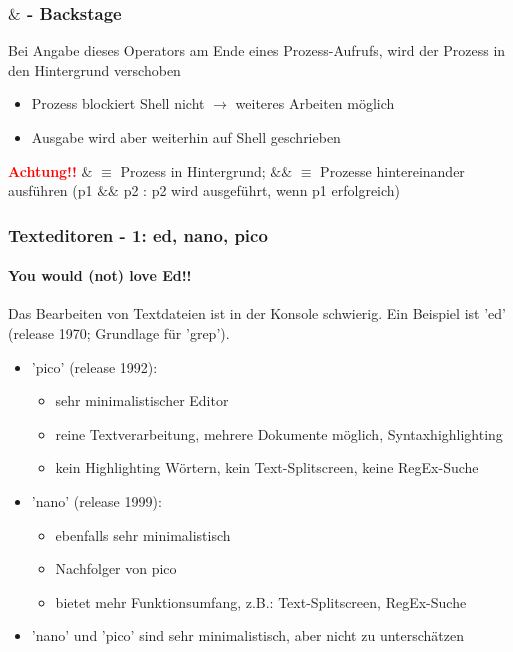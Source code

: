 \documentclass[12pt,utf8, handout]{beamer}
\begin{document}
\begin{frame}
\frametitle{$\&$ - Backstage}
Bei Angabe dieses Operators am Ende eines Prozess-Aufrufs, wird der Prozess in den Hintergrund verschoben
\begin{itemize}[<+->]
	\item Prozess blockiert Shell nicht $\to$ weiteres Arbeiten möglich
	\item Ausgabe wird aber weiterhin auf Shell geschrieben
\end{itemize}
\textbf{\textcolor{red}{Achtung!!}} $\&$ $\equiv$ Prozess in Hintergrund; $\&\&$ $\equiv$ Prozesse hintereinander ausführen (p1 $\&\&$ p2 : p2 wird ausgeführt, wenn p1 erfolgreich)
\end{frame}

\begin{frame}
\frametitle{Texteditoren - 1: ed, nano, pico}
\framesubtitle{\textcolor{ownDarkOr}{You would (not) love Ed!!}}
Das Bearbeiten von Textdateien ist in der Konsole schwierig. Ein Beispiel ist 'ed' (release 1970; Grundlage für 'grep').
\begin{itemize}
	\item 'pico' (release 1992):
	\begin{itemize}[<+->]
		\item {\scriptsize sehr minimalistischer Editor}
		\item {\scriptsize reine Textverarbeitung, mehrere Dokumente möglich, Syntaxhighlighting}
		\item {\scriptsize kein Highlighting Wörtern, kein Text-Splitscreen, keine RegEx-Suche}
	\end{itemize}
	\item 'nano' (release 1999):
	\begin{itemize}[<+->]
		\item {\scriptsize ebenfalls sehr minimalistisch}
		\item {\scriptsize Nachfolger von pico}
		\item {\scriptsize bietet mehr Funktionsumfang, z.B.: Text-Splitscreen, RegEx-Suche}
	\end{itemize}
	\item 'nano' und 'pico' sind sehr minimalistisch, aber nicht zu unterschätzen
\end{itemize}
\end{frame}
\end{document}
